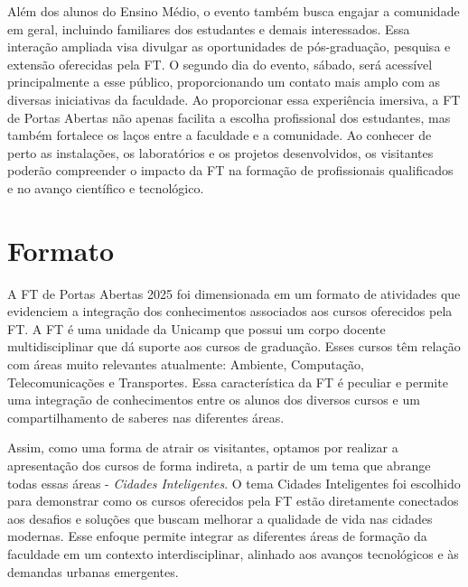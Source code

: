 \documentclass[
  letterpaper,
  DIV=11,
  numbers=noendperiod]{scrreprt}
\begin{document}
Além dos alunos do Ensino Médio, o evento também busca engajar a
comunidade em geral, incluindo familiares dos estudantes e demais
interessados. Essa interação ampliada visa divulgar as oportunidades de
pós-graduação, pesquisa e extensão oferecidas pela FT. O segundo dia do
evento, sábado, será acessível principalmente a esse público,
proporcionando um contato mais amplo com as diversas iniciativas da
faculdade. Ao proporcionar essa experiência imersiva, a FT de Portas
Abertas não apenas facilita a escolha profissional dos estudantes, mas
também fortalece os laços entre a faculdade e a comunidade. Ao conhecer
de perto as instalações, os laboratórios e os projetos desenvolvidos, os
visitantes poderão compreender o impacto da FT na formação de
profissionais qualificados e no avanço científico e tecnológico.


\chapter{Formato}\label{formato}

A FT de Portas Abertas 2025 foi dimensionada em um formato de atividades
que evidenciem a integração dos conhecimentos associados aos cursos
oferecidos pela FT. A FT é uma unidade da Unicamp que possui um corpo
docente multidisciplinar que dá suporte aos cursos de graduação. Esses
cursos têm relação com áreas muito relevantes atualmente: Ambiente,
Computação, Telecomunicações e Transportes. Essa característica da FT é
peculiar e permite uma integração de conhecimentos entre os alunos dos
diversos cursos e um compartilhamento de saberes nas diferentes áreas.

Assim, como uma forma de atrair os visitantes, optamos por realizar a
apresentação dos cursos de forma indireta, a partir de um tema que
abrange todas essas áreas - \emph{Cidades Inteligentes}. O tema Cidades
Inteligentes foi escolhido para demonstrar como os cursos oferecidos
pela FT estão diretamente conectados aos desafios e soluções que buscam
melhorar a qualidade de vida nas cidades modernas. Esse enfoque permite
integrar as diferentes áreas de formação da faculdade em um contexto
interdisciplinar, alinhado aos avanços tecnológicos e às demandas
urbanas emergentes.
\end{document}
